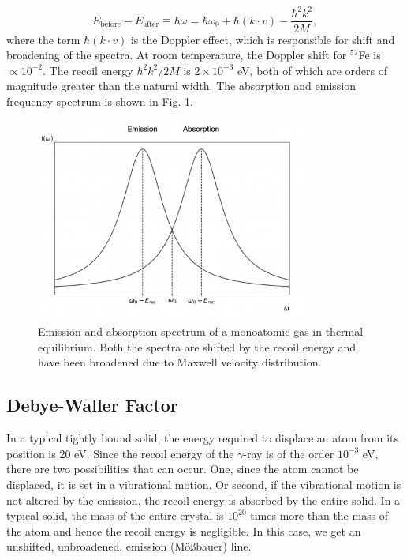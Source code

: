 \documentclass[a4paper]{report}
\numberwithin{equation}{section}
\begin{document}
\begin{equation}
		E_{\mathrm{before}} - E_{\mathrm{after}} \equiv \hbar \omega = \hbar \omega_{0} + \hbar (k \cdot v) - \frac{\hbar ^2 k^2}{2M},
\end{equation}
where the term $\hbar (k \cdot v)$ is the Doppler effect, which is responsible for shift and broadening of the spectra. At room temperature, the Doppler shift for $^{57}$Fe is $\propto 10^{-2}$. The recoil energy $\hbar ^2 k^2 / 2M$ is $2 \times 10^{-3}$ eV, both of which are orders of magnitude greater than the natural width. The absorption and emission frequency spectrum is shown in Fig. \ref{fig:doppler}.

\begin{figure}[htpb]
    \centering
    \includegraphics[width=0.8\textwidth]{doppler}
    \caption{Emission and absorption spectrum of a monoatomic gas in thermal equilibrium. Both the spectra are shifted by the recoil energy and have been broadened due to Maxwell velocity distribution.}
    \label{fig:doppler}
\end{figure}


\subsection{Debye-Waller Factor}
In a typical tightly bound solid, the energy required to displace an atom from its position is 20 eV. Since the recoil energy of the $\gamma$-ray is of the order $10^{-3}$ eV, there are two possibilities that can occur. One, since the atom cannot be displaced, it is set in a vibrational motion. Or second, if the vibrational motion is not altered by the emission, the recoil energy is absorbed by the entire solid. In a typical solid, the mass of the entire crystal is $10^{20}$ times more than the mass of the atom and hence the recoil energy is negligible. In this case, we get an unshifted, unbroadened, emission (M\"o{\ss}bauer) line. 
\end{document}

